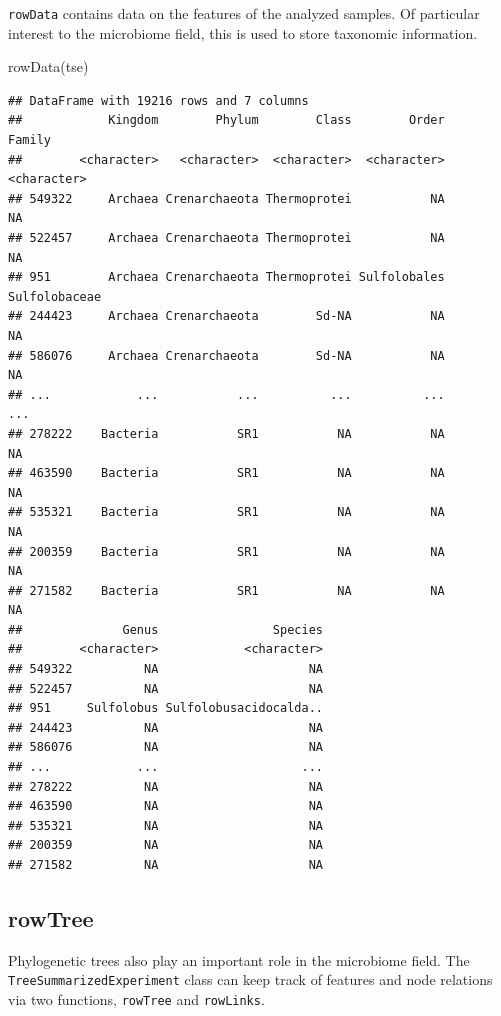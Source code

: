 \documentclass[
]{book}
\newenvironment{Shaded}{\begin{snugshade}}{\end{snugshade}}
\newcommand{\FunctionTok}[1]{\textcolor[rgb]{0.00,0.00,0.00}{#1}}
\newcommand{\NormalTok}[1]{#1}
\begin{document}
\texttt{rowData} contains data on the features of the analyzed samples. Of particular
interest to the microbiome field, this is used to store taxonomic information.

\begin{Shaded}
\begin{Highlighting}[]
\FunctionTok{rowData}\NormalTok{(tse)}
\end{Highlighting}
\end{Shaded}

\begin{verbatim}
## DataFrame with 19216 rows and 7 columns
##            Kingdom        Phylum        Class        Order        Family
##        <character>   <character>  <character>  <character>   <character>
## 549322     Archaea Crenarchaeota Thermoprotei           NA            NA
## 522457     Archaea Crenarchaeota Thermoprotei           NA            NA
## 951        Archaea Crenarchaeota Thermoprotei Sulfolobales Sulfolobaceae
## 244423     Archaea Crenarchaeota        Sd-NA           NA            NA
## 586076     Archaea Crenarchaeota        Sd-NA           NA            NA
## ...            ...           ...          ...          ...           ...
## 278222    Bacteria           SR1           NA           NA            NA
## 463590    Bacteria           SR1           NA           NA            NA
## 535321    Bacteria           SR1           NA           NA            NA
## 200359    Bacteria           SR1           NA           NA            NA
## 271582    Bacteria           SR1           NA           NA            NA
##              Genus                Species
##        <character>            <character>
## 549322          NA                     NA
## 522457          NA                     NA
## 951     Sulfolobus Sulfolobusacidocalda..
## 244423          NA                     NA
## 586076          NA                     NA
## ...            ...                    ...
## 278222          NA                     NA
## 463590          NA                     NA
## 535321          NA                     NA
## 200359          NA                     NA
## 271582          NA                     NA
\end{verbatim}

\hypertarget{rowtree}{%
\subsection{rowTree}\label{rowtree}}

Phylogenetic trees also play an important role in the microbiome field. The
\texttt{TreeSummarizedExperiment} class can keep track of features and node
relations via two functions, \texttt{rowTree} and \texttt{rowLinks}.
\end{document}
